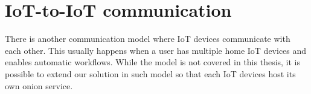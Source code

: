 \section{IoT-to-IoT communication}
There is another communication model where IoT devices communicate with each other. This usually happens when a user has multiple home IoT devices and enables automatic workflows. While the model is not covered in this thesis, it is possible to extend our solution in such model so that each IoT devices host its own onion service.